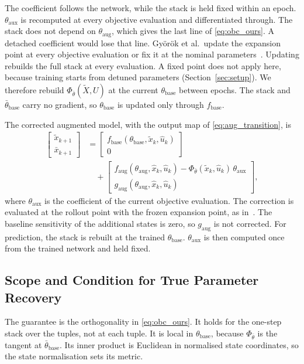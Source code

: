 The coefficient follows the network, while the stack is held fixed within an
epoch.
$\theta_{\mathrm{aux}}$ is recomputed at every objective evaluation and
differentiated through.
The stack does not depend on $\theta_{\mathrm{aug}}$, which gives the last
line of \eqref{eq:obc_ours}.
A detached coefficient would lose that line.
Gy\"or\"ok et al.\ update the expansion point at every objective evaluation or
fix it at the nominal parameters~\cite[Sec.~4]{gyorok2025l4dc}.
Updating rebuilds the full stack at every evaluation.
A fixed point does not apply here, because training starts from detuned
parameters (Section~\ref{sec:setup}).
We therefore rebuild $\Phi_{\bar\theta}(\tilde X,U)$ at the current
$\theta_{\mathrm{base}}$ between epochs.
The stack and $\bar\theta_{\mathrm{base}}$ carry no gradient, so
$\theta_{\mathrm{base}}$ is updated only through $f_{\mathrm{base}}$.

The corrected augmented model, with the output map of
\eqref{eq:aug_transition}, is
\begin{equation}
\begin{aligned}
 \begin{bmatrix}\tilde x_{k+1}\\ \bar x_{k+1}\end{bmatrix}
 &=\begin{bmatrix}f_{\mathrm{base}}(\theta_{\mathrm{base}},\tilde x_k,\hat u_k)\\ 0\end{bmatrix}\\
 &\quad+\begin{bmatrix}f_{\mathrm{aug}}(\theta_{\mathrm{aug}},\hat x_k,\hat u_k)
   -\Phi_{\bar\theta}(\tilde x_k,\hat u_k)\,\theta_{\mathrm{aux}}\\
   g_{\mathrm{aug}}(\theta_{\mathrm{aug}},\hat x_k,\hat u_k)\end{bmatrix},
\end{aligned}
\label{eq:obc_model}
\end{equation}
where $\theta_{\mathrm{aux}}$ is the coefficient of the current objective
evaluation.
The correction is evaluated at the rollout point with the frozen expansion
point, as in~\cite[Eq.~(13)]{gyorok2026obc}.
The baseline sensitivity of the additional states is zero, so
$g_{\mathrm{aug}}$ is not corrected.
For prediction, the stack is rebuilt at the trained $\theta_{\mathrm{base}}$.
$\theta_{\mathrm{aux}}$ is then computed once from the trained network and
held fixed.

\subsection{Scope and Condition for True Parameter Recovery}\label{sec:obc_scope}
The guarantee is the orthogonality in \eqref{eq:obc_ours}.
It holds for the one-step stack over the tuples, not at each tuple.
It is local in $\theta_{\mathrm{base}}$, because $\Phi_{\bar\theta}$ is the
tangent at $\bar\theta_{\mathrm{base}}$.
Its inner product is Euclidean in normalised state coordinates, so the state
normalisation sets its metric.

